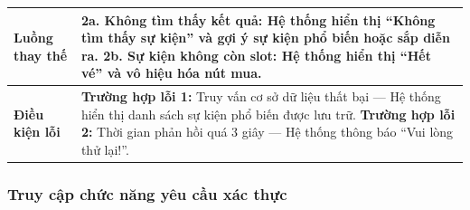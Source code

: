 \begin{longtable}{|p{}|p{}|}
\textbf{Luồng thay thế} &
2a. Không tìm thấy kết quả: \newline
\hspace*{1em}Hệ thống hiển thị “Không tìm thấy sự kiện” và gợi ý sự kiện phổ biến hoặc sắp diễn ra. \newline
2b. Sự kiện không còn slot: \newline
\hspace*{1em}Hệ thống hiển thị “Hết vé” và vô hiệu hóa nút mua. \\ \hline
\textbf{Điều kiện lỗi} &
\textbf{Trường hợp lỗi 1:} Truy vấn cơ sở dữ liệu thất bại — Hệ thống hiển thị danh sách sự kiện phổ biến được lưu trữ. \newline
\textbf{Trường hợp lỗi 2:} Thời gian phản hồi quá 3 giây — Hệ thống thông báo “Vui lòng thử lại!”. \\ \hline
\end{longtable}
\vspace{15pt}

\subsubsection{Truy cập chức năng yêu cầu xác thực}

